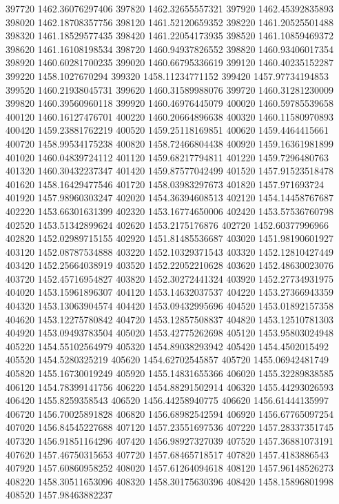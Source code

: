 {397720 1462.36076297406
397820 1462.32655557321
397920 1462.45392835893
398020 1462.18708357756
398120 1461.52120659352
398220 1461.20525501488
398320 1461.18529577435
398420 1461.22054173935
398520 1461.10859469372
398620 1461.16108198534
398720 1460.94937826552
398820 1460.93406017354
398920 1460.60281700235
399020 1460.66795336619
399120 1460.40235152287
399220 1458.1027670294
399320 1458.11234771152
399420 1457.97734194853
399520 1460.21938045731
399620 1460.31589988076
399720 1460.31281230009
399820 1460.39560960118
399920 1460.46976445079
400020 1460.59785539658
400120 1460.16127476701
400220 1460.20664896638
400320 1460.11580970893
400420 1459.23881762219
400520 1459.25118169851
400620 1459.4464415661
400720 1458.99534175238
400820 1458.72466804438
400920 1459.16361981899
401020 1460.04839724112
401120 1459.68217794811
401220 1459.7296480763
401320 1460.30432237347
401420 1459.87577042499
401520 1457.91523518478
401620 1458.16429477546
401720 1458.03983297673
401820 1457.971693724
401920 1457.98960303247
402020 1454.36394608513
402120 1454.14458767687
402220 1453.66301631399
402320 1453.16774650006
402420 1453.57536760798
402520 1453.51342899624
402620 1453.2175176876
402720 1452.60377996966
402820 1452.02989715155
402920 1451.81485536687
403020 1451.98190601927
403120 1452.08787534888
403220 1452.10329371543
403320 1452.12810427449
403420 1452.25664038919
403520 1452.22052210628
403620 1452.48630023076
403720 1452.45716954827
403820 1452.30272441324
403920 1452.27734931975
404020 1453.15961896307
404120 1453.14632037537
404220 1453.27366943359
404320 1453.13063904574
404420 1453.09432995696
404520 1453.01892157358
404620 1453.12275780842
404720 1453.12857508837
404820 1453.12510781303
404920 1453.09493783504
405020 1453.42775262698
405120 1453.95803024948
405220 1454.55102564979
405320 1454.89038293942
405420 1454.4502015492
405520 1454.5280325219
405620 1454.62702545857
405720 1455.06942481749
405820 1455.16730019249
405920 1455.14831655366
406020 1455.32289838585
406120 1454.78399141756
406220 1454.88291502914
406320 1455.44293026593
406420 1455.8259358543
406520 1456.44258940775
406620 1456.61444135997
406720 1456.70025891828
406820 1456.68982542594
406920 1456.67765097254
407020 1456.84545227688
407120 1457.23551697536
407220 1457.28337351745
407320 1456.91851164296
407420 1456.98927327039
407520 1457.36881073191
407620 1457.46750315653
407720 1457.68465718517
407820 1457.4183886543
407920 1457.60860958252
408020 1457.61264094618
408120 1457.96148526273
408220 1458.30511653096
408320 1458.30175630396
408420 1458.15896801998
408520 1457.98463882237
}

